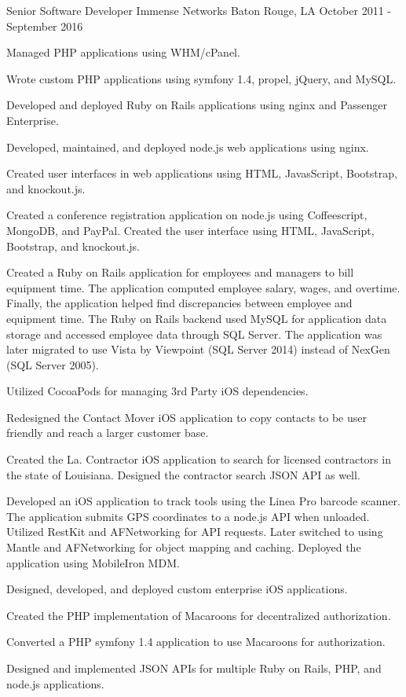 \documentclass[letterpaper]{awesome-cv}
\begin{document}
\begin{cventries}
	\cventry
    {Senior Software Developer}
    {Immense Networks}
    {Baton Rouge, LA}
    {October 2011 - September 2016}
    {\begin{cvitems}
      \item {Managed PHP applications using WHM/cPanel.}
      \item {Wrote custom PHP applications using symfony 1.4, propel, jQuery, and MySQL.}
      \item {Developed and deployed Ruby on Rails applications using nginx and Passenger Enterprise.}
      \item {Developed, maintained, and deployed node.js web applications using nginx.}
      \item {Created user interfaces in web applications using HTML, JavasScript, Bootstrap, and knockout.js.}
      \item {Created a conference registration application on node.js using Coffeescript, MongoDB, and PayPal. Created the user interface using HTML, JavaScript, Bootstrap, and knockout.js.}
      \item {Created a Ruby on Rails application for employees and managers to bill equipment time. The application computed employee salary, wages, and overtime. Finally, the application helped find discrepancies between employee and equipment time. The Ruby on Rails backend used MySQL for application data storage and accessed employee data through SQL Server. The application was later migrated to use Vista by Viewpoint (SQL Server 2014) instead of NexGen (SQL Server 2005).}
      \item {Utilized CocoaPods for managing 3rd Party iOS dependencies.}
      \item {Redesigned the Contact Mover iOS application to copy contacts to be user friendly and reach a larger customer base.}
      \item {Created the La. Contractor iOS application to search for licensed contractors in the state of Louisiana. Designed the contractor search JSON API as well.}
      \item {Developed an iOS application to track tools using the Linea Pro barcode scanner. The application submits GPS coordinates to a node.js API when unloaded. Utilized RestKit and AFNetworking for API requests. Later switched to using Mantle and AFNetworking for object mapping and caching. Deployed the application using MobileIron MDM.}
      \item {Designed, developed, and deployed custom enterprise iOS applications.}
      \item {Created the PHP implementation of Macaroons for decentralized authorization.}
      \item {Converted a PHP symfony 1.4 application to use Macaroons for authorization.}
      \item {Designed and implemented JSON APIs for multiple Ruby on Rails, PHP, and node.js applications.}
      \end{cvitems}}


\end{cventries}
\end{document}
